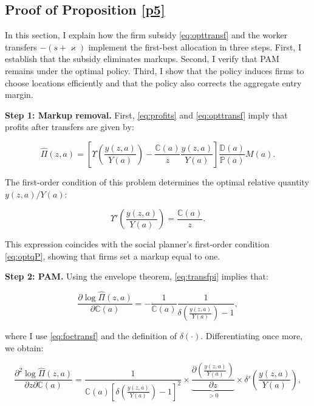 
\subsection{Proof of Proposition \ref{p5}}\label{a:implement}
In this section, I explain how the firm subsidy \eqref{eq:opttransf} and the worker transfers $-(s + \varkappa)$ implement the first-best allocation in three steps. First, I establish that the subsidy eliminates markups. Second, I verify that PAM remains under the optimal policy. Third, I show that the policy induces firms to choose locations efficiently and that the policy also corrects the aggregate entry margin.

\textbf{Step 1: Markup removal.} First, \eqref{eq:profits} and \eqref{eq:opttransf} imply that profits after transfers are given by:

\begin{equation}\label{eq:transfpi}
\widehat{\Pi}(z,a) = \left[\Upsilon\left(\frac{y(z,a)}{Y(a)}\right) - \frac{\mathbb{C}(a)}{z} \frac{y(z,a)}{Y(a)} \right]\frac{\mathbb{D}(a)}{\mathbb{P}(a)}M(a).
\end{equation}

The first-order condition of this problem determines the optimal relative quantity $y(z,a)/Y(a)$:

\begin{equation}\label{eq:foctransf}
\Upsilon'\left(\frac{y(z,a)}{Y(a)}\right) = \frac{\mathbb{C}(a)}{z}.
\end{equation}

This expression coincides with the social planner’s first-order condition \eqref{eq:optqP}, showing that firms set a markup equal to one.

\textbf{Step 2: PAM.} Using the envelope theorem, \eqref{eq:transfpi} implies that:

\begin{equation*}
\frac{\partial \log \widehat{\Pi}(z,a)}{\partial \mathbb{C}(a)} = -\frac{1}{\mathbb{C}(a)} \frac{1}{\delta\left(\frac{y(z,a)}{Y(a)}\right) - 1},
\end{equation*}

where I use \eqref{eq:foctransf} and the definition of $\delta\left(\cdot\right)$. Differentiating once more, we obtain:

\begin{equation*}
\frac{\partial^2 \log \widehat{\Pi}(z,a)}{\partial z \partial \mathbb{C}(a)} = \frac{1}{\mathbb{C}(a) \left[\delta\left(\frac{y(z,a)}{Y(a)}\right) - 1\right]^2} \times\underbrace{\frac{\partial \left(\frac{y(z,a)}{Y(a)}\right)}{\partial z}}_{>0} \times \delta'\left(\frac{y(z,a)}{Y(a)}\right),
\end{equation*}

